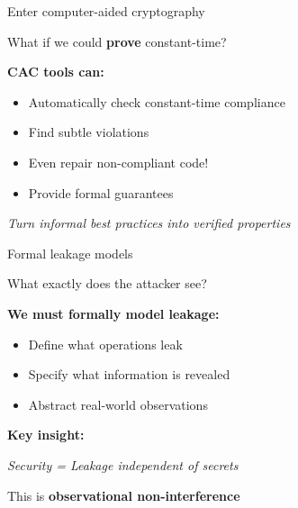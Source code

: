 \documentclass[aspectratio=169, lualatex, handout]{beamer}
\begin{document}
\begin{frame}{Enter computer-aided cryptography}
	\begin{center}
		\Large
		What if we could \textbf{prove} constant-time?
	\end{center}
	\vspace{1em}
	\textbf{CAC tools can:}
	\begin{itemize}
		\item Automatically check constant-time compliance
		\item Find subtle violations
		\item Even repair non-compliant code!
		\item Provide formal guarantees
	\end{itemize}
	\vspace{0.5em}
	\begin{center}
		\textit{Turn informal best practices into verified properties}
	\end{center}
\end{frame}

\begin{frame}{Formal leakage models}
	\begin{center}
		\Large
		What exactly does the attacker see?
	\end{center}
	\vspace{1em}
	\textbf{We must formally model leakage:}
	\begin{itemize}
		\item Define what operations leak
		\item Specify what information is revealed
		\item Abstract real-world observations
	\end{itemize}
	\vspace{0.5em}
	\textbf{Key insight:}
	\begin{center}
		\textit{Security = Leakage independent of secrets}
	\end{center}
	\vspace{0.5em}
	This is \textbf{observational non-interference}
\end{frame}
\end{document}
